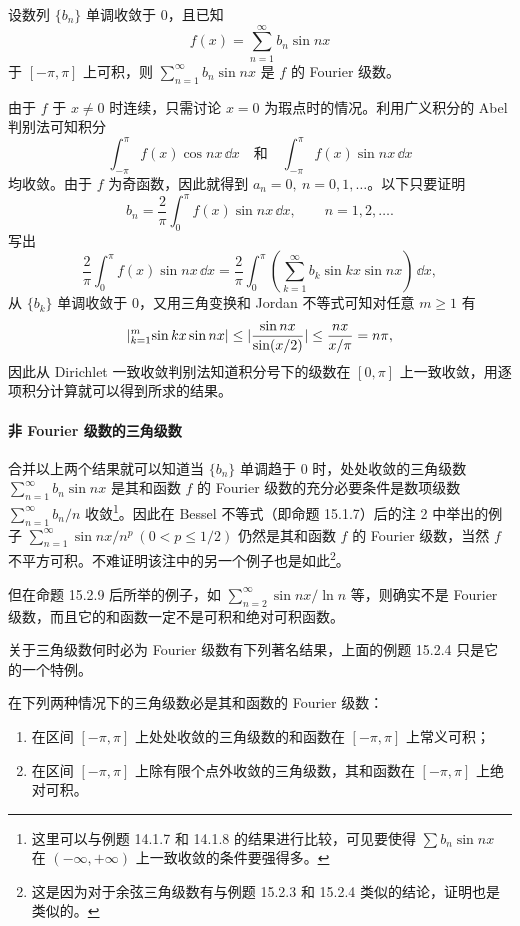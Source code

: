 \begin{xexample}[15.2.4]
设数列 $\{b_n\}$ 单调收敛于 0，且已知
\[
  f(x)=\sum_{n=1}^{\infty}b_n\sin nx
\]
于 $[-\pi,\pi]$ 上可积，则 $\sum_{n=1}^{\infty}b_n\sin nx$ 是 $f$ 的 Fourier 级数。
\end{xexample}
\begin{xproof}
由于 $f$ 于 $x\ne0$ 时连续，只需讨论 $x=0$ 为瑕点时的情况。利用广义积分的 Abel 判别法可知积分
\[
  \int_{-\pi}^{\pi}f(x)\cos nx\,\dd x\quad\text{和}\quad
  \int_{-\pi}^{\pi}f(x)\sin nx\,\dd x
\]
均收敛。由于 $f$ 为奇函数，因此就得到 $a_n=0,\ n=0,1,\ldots$。以下只要证明
\[
  b_n=\frac2\pi\int_0^{\pi}f(x)\sin nx\,\dd x,\qquad n=1,2,\ldots.
\]
写出
\[
  \frac2\pi\int_0^{\pi}f(x)\sin nx\,\dd x
  =\frac2\pi\int_0^{\pi}\left(\sum_{k=1}^{\infty}b_k\sin kx\sin nx\right)\,\dd x,
\]
从 $\{b_k\}$ 单调收敛于 0，又用三角变换和 Jordan 不等式可知对任意 $m\ge1$ 有
\[
  \lvert\relax_{k=1}^{m}\sin kx\sin nx\rvert
  \le\lvert\frac{\sin nx}{\sin(x/2)}\rvert
  \le\frac{nx}{x/\pi}=n\pi,
\]
因此从 Dirichlet 一致收敛判别法知道积分号下的级数在 $[0,\pi]$ 上一致收敛，用逐项积分计算就可以得到所求的结果。
\end{xproof}

\paragraph{非 Fourier 级数的三角级数}
合并以上两个结果就可以知道当 $\{b_n\}$ 单调趋于 0 时，处处收敛的三角级数 $\sum_{n=1}^{\infty}b_n\sin nx$ 是其和函数 $f$ 的 Fourier 级数的充分必要条件是数项级数 $\sum_{n=1}^{\infty}b_n/n$ 收敛\footnote{这里可以与例题 14.1.7 和 14.1.8 的结果进行比较，可见要使得 $\sum b_n\sin nx$ 在 $(-\infty,+\infty)$ 上一致收敛的条件要强得多。}。因此在 Bessel 不等式（即命题 15.1.7）后的注 2 中举出的例子 $\sum_{n=1}^{\infty}\sin nx/n^p\ (0<p\le1/2)$ 仍然是其和函数 $f$ 的 Fourier 级数，当然 $f$ 不平方可积。不难证明该注中的另一个例子也是如此\footnote{这是因为对于余弦三角级数有与例题 15.2.3 和 15.2.4 类似的结论，证明也是类似的。}。

但在命题 15.2.9 后所举的例子，如 $\sum_{n=2}^{\infty}\sin nx/\ln n$ 等，则确实不是 Fourier 级数，而且它的和函数一定不是可积和绝对可积函数。

关于三角级数何时必为 Fourier 级数有下列著名结果，上面的例题 15.2.4 只是它的一个特例。

\begin{xproposition}
在下列两种情况下的三角级数必是其和函数的 Fourier 级数：
\begin{enumerate}[label=(\arabic*)]
  \item 在区间 $[-\pi,\pi]$ 上处处收敛的三角级数的和函数在 $[-\pi,\pi]$ 上常义可积；
  \item 在区间 $[-\pi,\pi]$ 上除有限个点外收敛的三角级数，其和函数在 $[-\pi,\pi]$ 上绝对可积。
\end{enumerate}
\end{xproposition}

